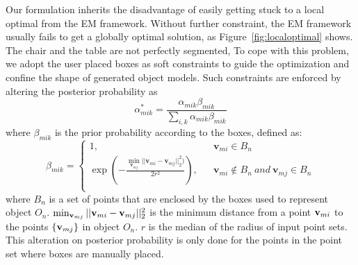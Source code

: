 Our formulation inherits the disadvantage of easily getting stuck to a local optimal from the EM framework.
Without further constraint, the EM framework usually fails to get a globally optimal solution, as Figure~\ref{fig:localoptimal} shows. 
The chair and the table are not perfectly segmented,
%
To cope with this problem, we adopt the user placed boxes as soft constraints to guide the optimization and confine the shape of generated object models. 
Such constraints are enforced by altering the posterior probability as
\begin{equation}
	\label{equ:alteralpha}
	\alpha_{mik}^*=\frac{\alpha_{mik}\beta_{mik}}{\sum_{i,k}\alpha_{mik}\beta_{mik}}
\end{equation}
%
where $\beta_{mik}$ is the prior probability according to the boxes, defined as:
\begin{equation}
	\beta_{mik}=\left\{
	\begin{array}{lcl}
		1,& &\mathbf v_{mi} \in B_n\\
		\exp(-\frac{\min_{\mathbf v_{mj}}|| \mathbf v_{mi} - \mathbf v_{mj} ||_2^2  )}{
			2r^2}),& &\mathbf v_{mi} \notin B_n~and~\mathbf v_{mj} \in B_n\\
	\end{array} \right.
\end{equation}
%
where $B_n$ is a set of points that are enclosed by the boxes used to represent object $O_{n}$. 
%
$\min_{\mathbf{v}_{mj}}|| \mathbf{v}_{mi} - \mathbf{v}_{mj} ||_2^2$ is the minimum distance from a point $\mathbf{v}_{mi}$ to the points $\{\mathbf{v}_{mj}\}$ in object $O_n$.
$r$ is the median of the radius of input point sets.
%   
This alteration on posterior probability is only done for the points in the point set where boxes are manually placed. 
%

